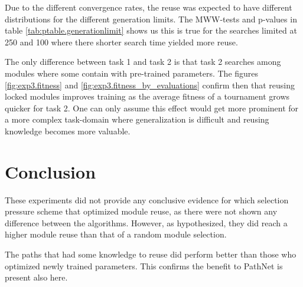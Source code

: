 Due to the different convergence rates, the reuse was expected to have different distributions for the different generation limits. The MWW-tests and p-values in table \ref{tab:ptable.generationlimit} shows us this is true for the searches limited at 250 and 100 where there shorter search time yielded more reuse. 

The only difference between task 1 and task 2 is that task 2 searches among modules where some contain with pre-trained parameters. The figures \ref{fig:exp3.fitness} and \ref{fig:exp3.fitness_by_evaluations} confirm then that reusing locked modules improves training as the average fitness of a tournament grows quicker for task 2. One can only assume this effect would get more prominent for a more complex task-domain where generalization is difficult and reusing knowledge becomes more valuable.   

\section{Conclusion}
These experiments did not provide any conclusive evidence for which selection pressure scheme that optimized module reuse, as there were not shown any difference between the algorithms. However, as hypothesized, they did reach a higher module reuse than that of a random module selection. 

The paths that had some knowledge to reuse did perform better than those who optimized newly trained parameters. This confirms the benefit to PathNet is present also here. 